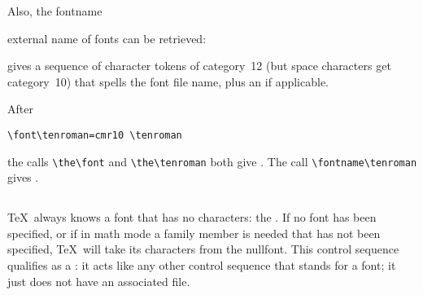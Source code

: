 \documentclass{book}
\begin{document}
Also, the
\cstoidx fontname\par
external name of fonts can be retrieved:
\begin{Disp}\end{Disp}
gives a sequence of character tokens of category~12
(but space characters get category~10) that spells the font file
name, plus an  if applicable.

\begin{example} After
\begin{verbatim}
\font\tenroman=cmr10 \tenroman
\end{verbatim}
the calls
\verb>\the\font> and \verb>\the\tenroman> both give .
The call \verb>\fontname\tenroman> gives .
\end{example}

\subsection{}

\TeX\ always knows a font that has no characters: the .
If no font has been specified, or if in math mode a family member
is needed that has not been specified,
\TeX\ will take its characters from the nullfont.
This control sequence qualifies as a :
it acts like any other control sequence that stands for a font;
it just does not have an associated  file.
\end{document}
